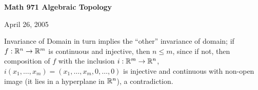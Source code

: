 \def\ccy{\Cyan}		  %
\def\cpb{\ProcessBlue}	  %
\def\csb{\SkyBlue}	  %
\def\ctu{\Turquoise}	  %
\def\ctb{\TealBlue}	  %
\def\caq{\Aquamarine}	  %
\def\cbg{\BlueGreen}	  %
\def\cem{\Emerald}	  %
\def\csg{\SeaGreen}	  %
\def\cgg{\Green}	  %
\def\cfg{\ForestGreen}	  %
\def\cpg{\PineGreen}	  %
\def\clg{\LimeGreen}	  %
\def\cyg{\YellowGreen}	  %
\def\cspg{\SpringGreen}	  %
\def\cog{\OliveGreen}	  %
\def\pars{\RawSienna}	  %
\def\cse{\Sepia}		  %
\def\cbr{\Brown}		  %
\def\cta{\Tan}		  %
\def\cgr{\Gray}		  %
\def\cbl{\Black}		  %
\def\cwh{\White}		  %


\loadmsbm



\def\ctln{\centerline}
\def\u{\underbar}
\def\ssk{\smallskip}
\def\msk{\medskip}
\def\bsk{\bigskip}
\def\hsk{\hskip.1in}
\def\hhsk{\hskip.2in}
\def\dsl{\displaystyle}
\def\hskp{\hskip1.5in}

\def\lra{$\Leftrightarrow$ }
\def\ra{\rightarrow}
\def\mpto{\logmapsto}
\def\pu{\pi_1}
\def\mpu{$\pi_1$}
\def\sig{\Sigma}
\def\msig{$\Sigma$}
\def\ep{\epsilon}
\def\sset{\subseteq}
\def\del{\partial}
\def\inv{^{-1}}
\def\wtl{\widetilde}
\def\lra{\Leftrightarrow}
\def\del{\partial}
\def\delp{\partial^\prime}
\def\delpp{\partial^{\prime\prime}}
\def\sgn{{\roman{sgn}}}
\def\wtih{\widetilde{H}}
\def\bbz{{\Bbb Z}}
\def\bbr{{\Bbb R}}



\ctln{\bf Math 971 Algebraic Topology}

\ssk

\ctln{April 26, 2005}

\msk


Invariance of Domain in turn implies the ``other'' invariance of domain; if $f: {\Bbb R}^n\ra {\Bbb R}^m$ is continuous and injective, then
$n\leq m$, since if not, then composition of $f$ with the inclusion $i:{\Bbb R}^m\ra {\Bbb R}^n$, $i(x_1,\ldots ,x_m) = 
(x_1,\ldots ,x_m,0,\ldots ,0)$ is injective and continuous with non-open image (it lies in a hyperplane in ${\Bbb R}^n$),
a contradiction.

